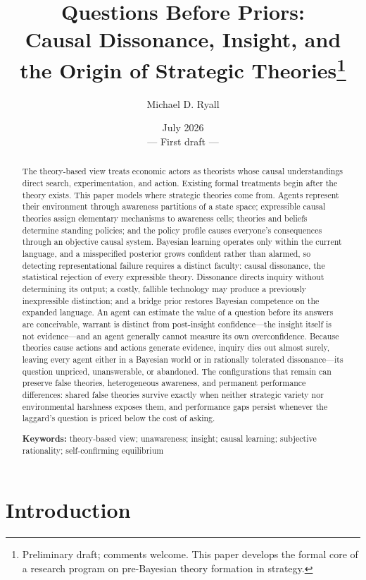 \documentclass[11pt]{article}
\title{\textbf{Questions Before Priors:}\\
Causal Dissonance, Insight, and the Origin of Strategic Theories\thanks{%
Preliminary draft; comments welcome.  This paper develops the formal core of
a research program on pre-Bayesian theory formation in strategy.}}
\author{Michael D. Ryall}
\date{July 2026\\[0.4em]\normalsize --- First draft ---}
\theoremstyle{definition}
\begin{document}
\maketitle

\begin{abstract}
\noindent The theory-based view treats economic actors as theorists whose causal understandings direct search, experimentation, and action.
Existing formal treatments begin after the theory exists.
This paper models where strategic theories come from.
Agents represent their environment through awareness partitions of a state space; expressible causal theories assign elementary mechanisms to awareness cells; theories and beliefs determine standing policies; and the policy profile causes everyone's consequences through an objective causal system.
Bayesian learning operates only within the current language, and a misspecified posterior grows confident rather than alarmed, so detecting representational failure requires a distinct faculty: causal dissonance, the statistical rejection of every expressible theory.
Dissonance directs inquiry without determining its output; a costly, fallible technology may produce a previously inexpressible distinction; and a bridge prior restores Bayesian competence on the expanded language.
An agent can estimate the value of a question before its answers are conceivable, warrant is distinct from post-insight confidence---the insight itself is not evidence---and an agent generally cannot measure its own overconfidence.
Because theories cause actions and actions generate evidence, inquiry dies out almost surely, leaving every agent either in a Bayesian world or in rationally tolerated dissonance---its question unpriced, unanswerable, or abandoned.
The configurations that remain can preserve false theories, heterogeneous awareness, and permanent performance differences: shared false theories survive exactly when neither strategic variety nor environmental harshness exposes them, and performance gaps persist whenever the laggard's question is priced below the cost of asking.
\medskip

\noindent\textbf{Keywords:} theory-based view; unawareness; insight; causal learning; subjective rationality; self-confirming equilibrium
\end{abstract}

\newpage

\section{Introduction}
\label{sec:intro}
\end{document}
